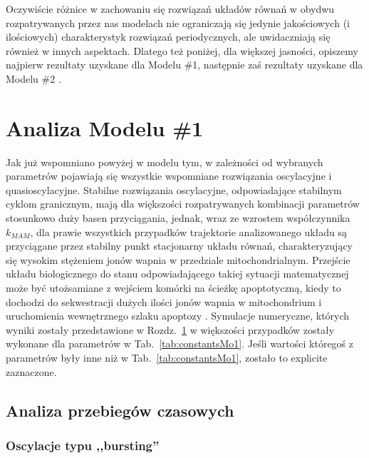 \smallskip

Oczywiście różnice w zachowaniu się rozwiązań układów równań w obydwu rozpatrywanych przez nas modelach nie ograniczają się jedynie jakościowych (i ilościowych) charakterystyk rozwiązań periodycznych, ale uwidaczniają się również w innych aspektach. Dlatego też poniżej, dla większej jasności, opiszemy najpierw rezultaty uzyskane dla Modelu \#1, następnie zaś rezultaty uzyskane dla Modelu \#2 .

\medskip 

\section{Analiza Modelu \#1}
\label{AnMo1}

Jak już wspomniano powyżej w modelu tym, w zależności od wybranych parametrów pojawiają się wszystkie wspomniane rozwiązania oscylacyjne i quasioscylacyjne. Stabilne rozwiązania oscylacyjne, odpowiadające stabilnym cyklom granicznym, mają dla większości rozpatrywanych kombinacji parametrów stosunkowo duży basen przyciągania, jednak, wraz ze wzrostem współczynnika $k_{MAM}$, dla prawie wszystkich przypadków trajektorie analizowanego układu są przyciągane przez stabilny punkt stacjonarny układu równań, charakteryzujący się wysokim stężeniem jonów wapnia w przedziale mitochondrialnym. Przejście układu biologicznego do stanu odpowiadającego takiej sytuacji matematycznej może być utożsamiane z wejściem komórki na ścieżkę apoptotyczną, kiedy to dochodzi do sekwestracji dużych ilości jonów wapnia w mitochondrium i uruchomienia wewnętrznego szlaku apoptozy \cite{Desagher2000,Galluzzi2012,Hajnoczky2006}. Symulacje numeryczne, których wyniki zostały przedstawione w  Rozdz.~\ref{AnMo1} w większości przypadków zostały wykonane dla parametrów w Tab.~\ref{tab:constantsMo1}. Jeśli wartości któregoś z parametrów były inne niż w Tab.~\ref{tab:constantsMo1}, zostało to explicite zaznaczone.


\FloatBarrier
\subsection{Analiza przebiegów czasowych}


\subsubsection*{Oscylacje typu ,,bursting''}

